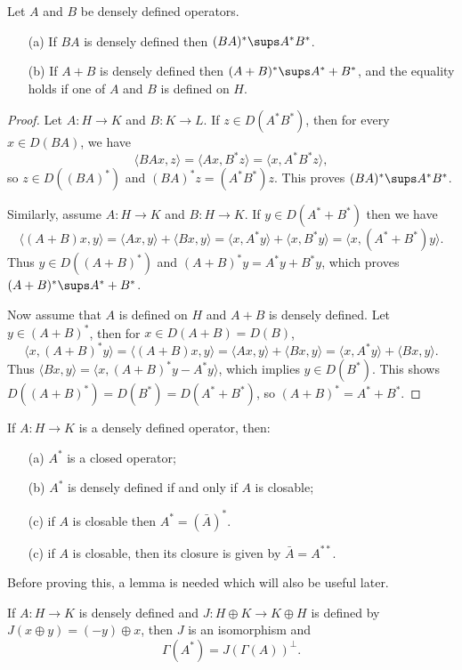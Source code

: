 \begin{proposition}\label{Hilbert space unbounded sum composition and adjoint}
Let $A$ and $B$ be densely defined operators.
\begin{itemize}
\item[(a)] If $BA$ is densely defined then $(BA)^*\sups A^*B^*$. 
\item[(b)] If $A+B$ is densely defined then $(A+B)^*\sups A^*+B^*$, and the equality holds if one of $A$ and $B$ is defined on $H$.
\end{itemize}
\end{proposition}
\begin{proof}
Let $A:H\to K$ and $B:K\to L$. If $z\in D(A^*B^*)$, then for every $x\in D(BA)$, we have
\[\langle BAx,z\rangle=\langle Ax,B^*z\rangle=\langle x,A^*B^*z\rangle,\]
so $z\in D((BA)^*)$ and $(BA)^*z=(A^*B^*)z$. This proves $(BA)^*\sups A^*B^*$.\par
Similarly, assume $A:H\to K$ and $B:H\to K$. If $y\in D(A^*+B^*)$ then we have
\[\langle (A+B)x,y\rangle=\langle Ax,y\rangle+\langle Bx,y\rangle=\langle x,A^*y\rangle+\langle x,B^*y\rangle=\langle x,(A^*+B^*)y\rangle.\]
Thus $y\in D((A+B)^*)$ and $(A+B)^*y=A^*y+B^*y$, which proves $(A+B)^*\sups A^*+B^*$.\par
Now assume that $A$ is defined on $H$ and $A+B$ is densely defined. Let $y\in(A+B)^*$, then for $x\in D(A+B)=D(B)$,
\[\langle x,(A+B)^*y\rangle=\langle(A+B)x,y\rangle=\langle Ax,y\rangle+\langle Bx,y\rangle=\langle x,A^*y\rangle+\langle Bx,y\rangle.\]
Thus $\langle Bx,y\rangle=\langle x,(A+B)^*y-A^*y\rangle$, which implies $y\in D(B^*)$. This shows $D((A+B)^*)=D(B^*)=D(A^*+B^*)$, so $(A+B)^*=A^*+B^*$.
\end{proof}
\begin{proposition}\label{Hilbert space closable and adjoint}
If $A:H\to K$ is a densely defined operator, then:
\begin{itemize}
\item[(a)] $A^*$ is a closed operator;
\item[(b)] $A^*$ is densely defined if and only if $A$ is closable;
\item[(c)] if $A$ is closable then $A^*=(\bar{A})^*$. 
\item[(c)] if $A$ is closable, then its closure is given by $\bar{A}=A^{**}$.
\end{itemize}
\end{proposition}
Before proving this, a lemma is needed which will also be useful later.
\begin{lemma}\label{Hilbert space char of graph of adjoint}
If $A:H\to K$ is densely defined and $J:H\oplus K\to K\oplus H$ is defined by $J(x\oplus y)=(-y)\oplus x$, then $J$ is an isomorphism and
\[\Gamma(A^*)=J(\Gamma(A))^\bot.\]
\end{lemma}
